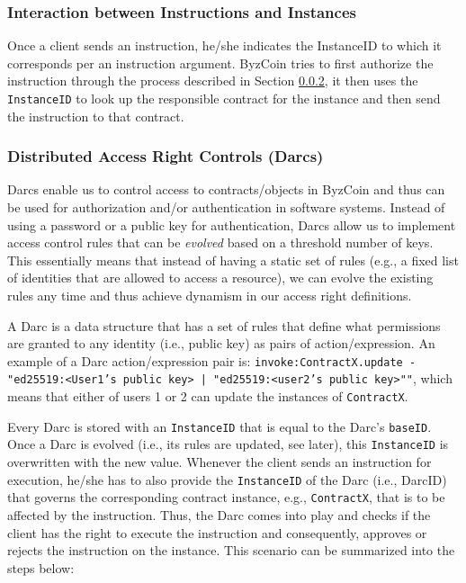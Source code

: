\subsubsection{Interaction between Instructions and Instances}
Once a client sends an instruction, he/she indicates the InstanceID to which it corresponds per an instruction argument. ByzCoin tries to first authorize the instruction through the process described in Section \ref{background:darc}, it then uses the \texttt{InstanceID} to look up the responsible contract for the instance and then send the instruction to that contract. 


\subsubsection{Distributed Access Right Controls (Darcs)}\label{background:darc}

Darcs enable us to control access to contracts/objects in ByzCoin and thus can be used for authorization and/or authentication in software systems. Instead of using a password or a public key for authentication, Darcs allow us to implement access control rules that can be \textit{evolved} based on a threshold number of keys. This essentially means that instead of having a static set of rules (e.g., a fixed list of identities that are allowed to access a resource), we can evolve the existing rules any time and thus achieve dynamism in our access right definitions.  

A Darc is a data structure that has a set of rules that define what permissions are granted to any identity (i.e., public key) as pairs of action/expression. An example of a Darc action/expression pair is: \texttt{invoke:ContractX.update - "ed25519:<User1's public key> | "ed25519:<user2's public key>""}, which means that either of users 1 or 2 can update the instances of \texttt{ContractX}. 

Every Darc is stored with an \texttt{InstanceID} that is equal to the Darc's \texttt{baseID}. Once a Darc is evolved (i.e., its rules are updated, see later), this \texttt{InstanceID} is overwritten with the new value. Whenever the client sends an instruction for execution, he/she has to also provide the \texttt{InstanceID} of the Darc (i.e., DarcID) that governs the corresponding contract instance, e.g., \texttt{ContractX}, that is to be affected by the instruction. Thus, the Darc comes into play and checks if the client has the right to execute the instruction and consequently, approves or rejects the instruction on the instance. This scenario can be summarized into the steps below:

